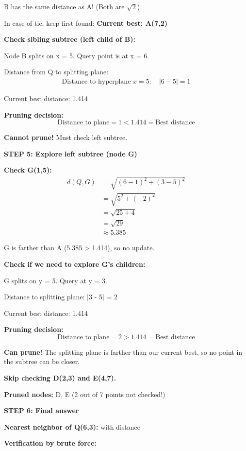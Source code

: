 \documentclass[12pt]{article}
\begin{document}
\begin{solution}
B has the same distance as A! (Both are $\sqrt{2}$)

In case of tie, keep first found: \textbf{Current best: A(7,2)}

\textbf{Check sibling subtree (left child of B):}

Node B splits on x = 5. Query point is at x = 6.

Distance from Q to splitting plane:
\begin{align*}
\text{Distance to hyperplane } x=5: \quad |6 - 5| = 1
\end{align*}

Current best distance: 1.414

\textbf{Pruning decision:}
\[
\text{Distance to plane} = 1 < 1.414 = \text{Best distance}
\]

\textbf{Cannot prune!} Must check left subtree.

\textbf{STEP 5: Explore left subtree (node G)}

\textbf{Check G(1,5):}
\begin{align*}
d(Q, G) &= \sqrt{(6-1)^2 + (3-5)^2} \\
&= \sqrt{5^2 + (-2)^2} \\
&= \sqrt{25 + 4} \\
&= \sqrt{29} \\
&\approx 5.385
\end{align*}

G is farther than A (5.385 > 1.414), so no update.

\textbf{Check if we need to explore G's children:}

G splits on y = 5. Query at y = 3.

Distance to splitting plane: |3 - 5| = 2

Current best distance: 1.414

\textbf{Pruning decision:}
\[
\text{Distance to plane} = 2 > 1.414 = \text{Best distance}
\]

\textbf{Can prune!} The splitting plane is farther than our current best, so no point in the subtree can be closer.

\textbf{Skip checking D(2,3) and E(4,7).}

\textbf{Pruned nodes:} D, E (2 out of 7 points not checked!)

\textbf{STEP 6: Final answer}

\textbf{Nearest neighbor of Q(6,3):}  \quad with distance 

\textbf{Verification by brute force:}


\end{solution}
\end{document}
